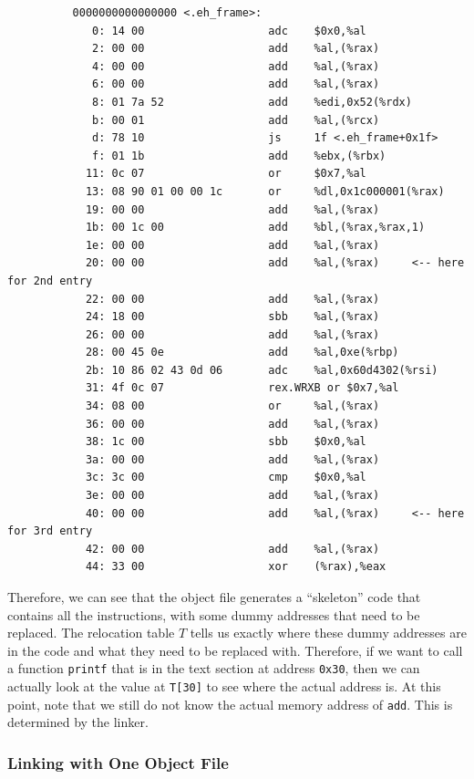 \documentclass{article}
\begin{document}
\begin{enumerate}
\begin{lstlisting}
          0000000000000000 <.eh_frame>:
             0:	14 00                	adc    $0x0,%al
             2:	00 00                	add    %al,(%rax)
             4:	00 00                	add    %al,(%rax)
             6:	00 00                	add    %al,(%rax)
             8:	01 7a 52             	add    %edi,0x52(%rdx)
             b:	00 01                	add    %al,(%rcx)
             d:	78 10                	js     1f <.eh_frame+0x1f>
             f:	01 1b                	add    %ebx,(%rbx)
            11:	0c 07                	or     $0x7,%al
            13:	08 90 01 00 00 1c    	or     %dl,0x1c000001(%rax)
            19:	00 00                	add    %al,(%rax)
            1b:	00 1c 00             	add    %bl,(%rax,%rax,1)
            1e:	00 00                	add    %al,(%rax)
            20:	00 00                	add    %al,(%rax)     <-- here for 2nd entry
            22:	00 00                	add    %al,(%rax)
            24:	18 00                	sbb    %al,(%rax)
            26:	00 00                	add    %al,(%rax)
            28:	00 45 0e             	add    %al,0xe(%rbp)
            2b:	10 86 02 43 0d 06    	adc    %al,0x60d4302(%rsi)
            31:	4f 0c 07             	rex.WRXB or $0x7,%al
            34:	08 00                	or     %al,(%rax)
            36:	00 00                	add    %al,(%rax)
            38:	1c 00                	sbb    $0x0,%al
            3a:	00 00                	add    %al,(%rax)
            3c:	3c 00                	cmp    $0x0,%al
            3e:	00 00                	add    %al,(%rax)
            40:	00 00                	add    %al,(%rax)     <-- here for 3rd entry
            42:	00 00                	add    %al,(%rax)
            44:	33 00                	xor    (%rax),%eax
        \end{lstlisting}
      \end{enumerate}
      Therefore, we can see that the object file generates a ``skeleton'' code that contains all the instructions, with some dummy addresses that need to be replaced. The relocation table $T$ tells us exactly where these dummy addresses are in the code and what they need to be replaced with. Therefore, if we want to call a function \texttt{printf} that is in the text section at address \texttt{0x30}, then we can actually look at the value at \texttt{T[30]} to see where the actual address is. At this point, note that we still do not know the actual memory address of \texttt{add}. This is determined by the linker. 

    \subsubsection{Linking with One Object File}
\end{document}

